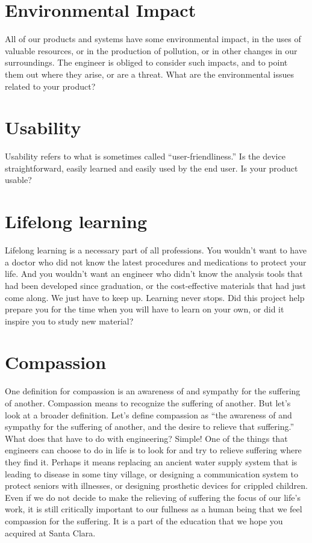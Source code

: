 \section{Environmental Impact} 
All of our products and systems have some environmental impact, in the uses of valuable resources, or in the production of pollution, or in other changes in our surroundings. The engineer is obliged to consider such impacts, and to point them out where they arise, or are a threat. What are the environmental issues related to your product?

\section{Usability} 
Usability refers to what is sometimes called “user-friendliness.” Is the device straightforward, easily learned and easily used by the end user. Is your product usable?

\section{Lifelong learning}
Lifelong learning is a necessary part of all professions. You wouldn’t want to have a doctor who did not know the latest procedures and medications to protect your life. And you wouldn’t want an engineer who didn’t know the analysis tools that had been developed since graduation, or the cost-effective materials that had just come along. We just have to keep up. Learning never stops. Did this project help prepare you for the time when you will have to learn on your own, or did it inspire you to study new material?

\section{Compassion}
One definition for compassion is an awareness of and sympathy for the suffering of another. Compassion means to recognize the suffering of another. But let’s look at a broader definition. Let’s define compassion as “the awareness of and sympathy for the suffering of another, and the desire to relieve that suffering.” What does that have to do with engineering? Simple! One of the things that engineers can choose to do in life is to look for and try to relieve suffering where they find it. Perhaps it means replacing an ancient water supply system that is leading to disease in some tiny village, or designing a communication system to protect seniors with illnesses, or designing prosthetic devices for crippled children. Even if we do not decide to make the relieving of suffering the focus of our life’s work, it is still critically important to our fullness as a human being that we feel compassion for the suffering. It is a part of the education that we hope you acquired at Santa Clara.
